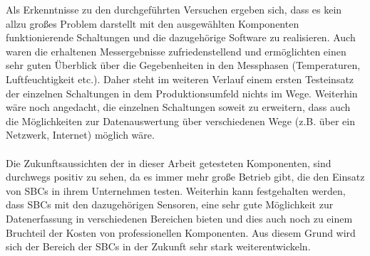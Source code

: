 Als Erkenntnisse zu den durchgeführten Versuchen ergeben sich, dass es kein allzu großes Problem darstellt mit den ausgewählten Komponenten funktionierende Schaltungen und die dazugehörige Software zu realisieren. Auch waren die erhaltenen Messergebnisse zufriedenstellend und ermöglichten einen sehr guten Überblick über die Gegebenheiten in den Messphasen (Temperaturen, Luftfeuchtigkeit etc.). Daher steht im weiteren Verlauf einem ersten Testeinsatz der einzelnen Schaltungen in dem Produktionsumfeld nichts im Wege. Weiterhin wäre noch angedacht, die einzelnen Schaltungen soweit zu erweitern, dass auch die Möglichkeiten zur Datenauswertung über verschiedenen Wege (z.B. über ein Netzwerk, Internet) möglich wäre.\\\\
Die Zukunftsaussichten der in dieser Arbeit getesteten Komponenten, sind durchwegs positiv zu sehen, da es immer mehr große Betrieb gibt, die den Einsatz von SBCs in ihrem Unternehmen testen. Weiterhin kann festgehalten werden, dass SBCs mit den dazugehörigen Sensoren, eine sehr gute Möglichkeit zur Datenerfassung in verschiedenen Bereichen bieten und dies auch noch zu einem Bruchteil der Kosten von professionellen Komponenten. Aus diesem Grund wird sich der Bereich der SBCs in der Zukunft sehr stark weiterentwickeln.
